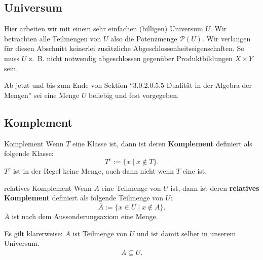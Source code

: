 \documentclass[a4paper]{amsart}
\theoremstyle{definition}
\newcommand{\PP}{\ensuremath{\mathcal{ P }}}
\newcommand{\zb}{z.~B. }
\begin{document}
\subsection{Universum}
Hier arbeiten wir mit einem sehr einfachen (billigen) Universum $U$. Wir betrachten alle Teilmengen von $U$ also die Potenzmenge $\PP(U)$. Wir verlangen für diesen Abschnitt keinerlei zusätzliche Abgeschlossenheitseigenschaften. So muss $U$ \zb nicht notwendig abgeschlossen gegenüber Produktbildungen $X \times Y$ sein.

Ab jetzt und bis zum Ende von Sektion "`3.0.2.0.5.5 Dualität in der Algebra der Mengen"' sei eine Menge $U$ beliebig und fest vorgegeben.
 
\subsection{Komplement}
\begin{Definition}{Komplement}
   Wenn $T$ eine Klasse ist, dann ist deren \textbf{Komplement} definiert als folgende Klasse:
   \begin{equation}\label{KomplementFormel}
      T^c := \{ x \mid x \notin T \}.
   \end{equation}
   $ T^c $ ist in der Regel keine Menge, auch dann nicht wenn $T$ eine ist.
\end{Definition}

\begin{Definition}{relatives Komplement}
   Wenn $A$ eine Teilmenge von $U$ ist, dann ist deren \textbf{relatives Komplement} definiert als folgende Teilmenge von $U$:
   \begin{equation}\label{KomplementRelativFormel}
      \overline{A} := \{ x \in U \mid x \notin A \}.
   \end{equation}
   $ \overline{A} $ ist nach dem Aussonderungsaxiom eine Menge.
\end{Definition}

Es gilt klarerweise: $ \overline{A} $ ist Teilmenge von $U$ und ist damit selber in unserem Universum.
\begin{equation}
   \overline{A} \subseteq U.
\end{equation}
\end{document}
